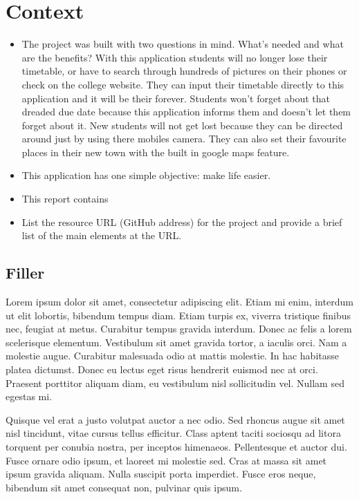 \chapter{Context}
\begin{itemize}
\item The project was built with two questions in mind. What's needed and what are the benefits? With this application students will no longer lose their timetable, or have to search through hundreds of pictures on their phones or check on the college website. They can input their timetable directly to this application and it will be their forever. Students won't forget about that dreaded due date because this application informs them and doesn't let them forget about it. New students will not get lost because they can be directed around just by using there mobiles camera. They can also set their favourite places in their new town with the built in google maps feature.
\item This application has one simple objective: make life easier.
\item This report contains 
\item List the resource URL (GitHub address) for the project and provide a brief list of the main elements at the URL.
\end{itemize}

\section{Filler}
Lorem ipsum dolor sit amet, consectetur adipiscing elit. Etiam mi enim, interdum ut elit lobortis, bibendum tempus diam. Etiam turpis ex, viverra tristique finibus nec, feugiat at metus. Curabitur tempus gravida interdum. Donec ac felis a lorem scelerisque elementum. Vestibulum sit amet gravida tortor, a iaculis orci. Nam a molestie augue. Curabitur malesuada odio at mattis molestie. In hac habitasse platea dictumst. Donec eu lectus eget risus hendrerit euismod nec at orci. Praesent porttitor aliquam diam, eu vestibulum nisl sollicitudin vel. Nullam sed egestas mi.

Quisque vel erat a justo volutpat auctor a nec odio. Sed rhoncus augue sit amet nisl tincidunt, vitae cursus tellus efficitur. Class aptent taciti sociosqu ad litora torquent per conubia nostra, per inceptos himenaeos. Pellentesque et auctor dui. Fusce ornare odio ipsum, et laoreet mi molestie sed. Cras at massa sit amet ipsum gravida aliquam. Nulla suscipit porta imperdiet. Fusce eros neque, bibendum sit amet consequat non, pulvinar quis ipsum.

